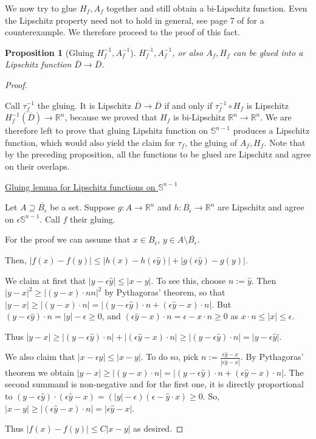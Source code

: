 \documentclass[english,a4paper,9pt,oneside]{scrbook}	%
\theoremstyle{break}
\newtheorem{prop}[equation]{Proposition}
\newenvironment{mproof}[1][\proofname]{%
  \begin{proof}[#1]$ $\par\nobreak\ignorespaces
}{%
  \end{proof}
}
\renewcommand*{\proofname}{Proof}
\theoremstyle{remark}
\newcommand{\mR}{\mathbb{R}}
\newcommand{\mS}{\mathbb{S}^{n-1}}
\newcommand{\yh}{\hat{y}}
\newcommand{\eps}{\epsilon}
\begin{document}
We now try to glue $H_f, A_f$ together and still obtain a bi-Lipschitz function. Even the Lipschitz property need not to hold in general, see page 7 of \cite{weaver} for a counterexample. We therefore proceed to the proof of this fact.

\begin{prop}[Gluing $H_f^{-1}, A_f^{-1}$]
\label{prop:gluing}
$H_f^{-1}, A_f^{-1}$, or also $A_f, H_f$ can be glued into a Lipschitz function $\overline{D}\rightarrow\overline{D}$.
\end{prop}
\begin{mproof}

Call $\tau_f^{-1}$ the gluing. It is Lipschitz $\overline{D}\rightarrow\overline{D}$ if and only if $\tau_f^{-1}\circ H_f$ is Lipschitz $H_f^{-1}(\overline{D})\rightarrow\mR^n$, because we proved that $H_f$ is bi-Lipschitz $\mR^n \rightarrow \mR^n$.
We are therefore left to prove that gluing Lipshitz function on $\mS$ produces a Lipschitz function, which would also yield the claim for $\tau_f$, the gluing of $A_f, H_f$. Note that by the preceding proposition, all the functions to be glued are Lipschitz and agree on their overlaps.

\underline{Gluing lemma for Lipschitz functions on $\mS$}

Let $A\supseteq \overline{B_\eps}$ be a set. Suppose $g:A\rightarrow\mR^n$ and $h:\overline{B_\eps}\rightarrow\mR^n$ are Lipschitz and agree on $\eps \mS$. Call $f$ their gluing.

For the proof we can assume that $x \in B_\eps$, $y \in A \setminus \overline{B_\eps}$.

Then, $|f(x)-f(y)|\leq |h(x)-h(\eps \yh)|+|g(\eps \yh)-g(y)|$.

We claim at first that $|y-\eps \yh|\leq  |x-y|$. To see this, choose $n:=\yh$. Then $|y-x|^2 \geq |(y-x)\cdot n n|^2$ by Pythagoras' theorem, so that $|y-x|\geq |(y-x)\cdot n| = |(y-\eps \yh)\cdot n + (\eps \yh -x)\cdot n|$. But $(y-\eps \yh)\cdot n=|y|-\eps \geq 0$, and $(\eps \yh -x)\cdot n = \eps - x\cdot n\geq 0 $ as $x\cdot n \leq |x|\leq \eps$.

Thus  $|y-x|\geq |(y-\eps \yh)\cdot n| + |(\eps \yh -x)\cdot n|\geq  |(y-\eps \yh)\cdot n|=|y-\eps \yh|$.

We also claim that $|x-\eps \yh|\leq |x-y|$. To do so, pick $n:=\frac{\eps\yh -x}{|\eps\yh-x|}$. By Pythagoras' theorem we obtain $|y-x|\geq |(y-x)\cdot n|=|(y-\eps \yh)\cdot n +(\eps \yh -x)\cdot n|$. The second summand is non-negative and for the first one, it is directly proportional to $(y-\eps \yh)\cdot(\eps \yh-x)=(|y|-\eps)(\eps-\yh\cdot x)\geq 0$. So, $|x-y|\geq |(\eps \yh -x)\cdot n|=|\eps \yh -x|$.

Thus $ |f(x)-f(y)|\leq C|x-y|$ as desired.

\end{mproof}
\end{document}
